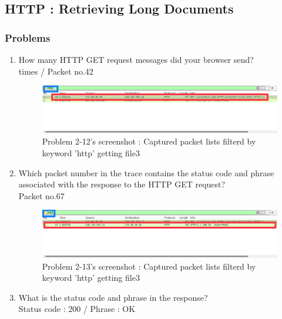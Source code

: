 \subsection{HTTP : Retrieving Long Documents}
    \subsubsection*{Problems}
    \begin{enumerate}[label=\bfseries Problem \arabic*:,leftmargin=*,labelindent=1em]\addtocounter{enumi}{11}
        \item How many HTTP GET request messages did your browser send? \\[0.2mm]
             times / Packet no.42
            \begin{figure}[!h]\centering
        		\includegraphics[width=.78\textwidth]{image/result_week01/Q2-c.png}
        		\caption{\footnotesize Problem 2-12's screenshot : Captured packet lists filterd by keyword 'http' getting file3}
        		\vspace{-10pt}
            \end{figure}   
        \item Which packet number in the trace contains the status code and phrase associated with the response to the HTTP GET request?\\[0.2mm]
            \soln  Packet no.67 
            \begin{figure}[!h]\centering
        		\includegraphics[width=.78\textwidth]{image/result_week01/Q2-d.png}
        		\caption{\footnotesize Problem 2-13's screenshot : Captured packet lists filterd by keyword 'http' getting file3}
        		\vspace{-10pt}
            \end{figure}            
        \item What is the status code and phrase in the response?\\[0.2mm]
            \soln Status code : 200 / Phrase : OK
            \begin{figure}[!h]\centering

\end{figure}
\end{enumerate}

